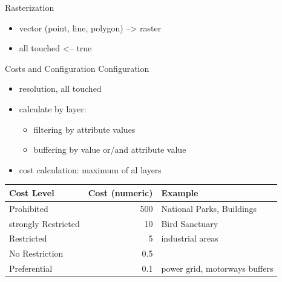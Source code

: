 \documentclass[usenames,dvipsnames,aspectratio=169]{beamer}
\begin{document}
\begin{frame}{Rasterization}
	\begin{itemize}
		\item vector (point, line, polygon) --> raster
		\item all touched <-- true
	\end{itemize}
	\vspace{5.0mm}
\end{frame}



\begin{frame}{Costs and Configuration}
	Configuration
	\begin{itemize}
		\item resolution, all touched
		\item calculate by layer:
		\begin{itemize}
			\item filtering by attribute values
			\item buffering by value or/and attribute value
		\end{itemize}
		\item cost calculation: maximum of al layers
	\end{itemize}

	\vspace{5.0mm}
	\begin{tabular}{ l  r  l }
	Cost Level & Cost (numeric) &  Example\\
	\hline
	Prohibited & 500					& National Parks, Buildings \\
	strongly Restricted & 10 	& Bird Sanctuary \\
	Restricted & 5	& industrial areas \\
	No Restriction & 0.5					& \color{green}{default}\\
	Preferential & 0.1					& power grid, motorways buffers\\
\end{tabular}

\end{frame}
\end{document}
